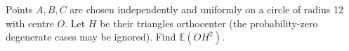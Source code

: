 Points $A,B,C$ are chosen independently and uniformly on a circle of radius 12 with centre $O$. Let $H$ be their triangle\textquotesingle s orthocenter (the probability-zero degenerate cases may be ignored). Find $\mathbb E(OH^2)$.
